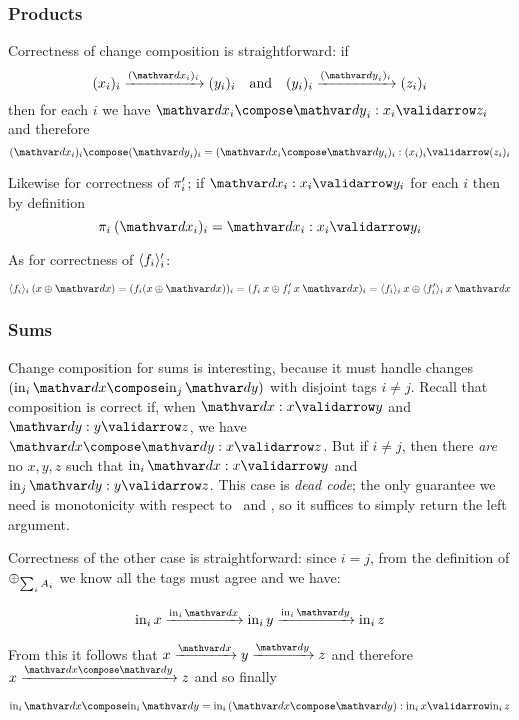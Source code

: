 \subsubsection{Products}

Correctness of change composition is straightforward: if
%
\[ \vld{(\dx_i)_i}{(x_i)_i}{(y_i)_i}
\quad\text{and}\quad
\vld{(\dy_i)_i}{(y_i)_i}{(z_i)_i} \]
%
then for each $i$ we have $\valid{\dx_i \compose \dy_i}{x_i}{z_i}$ and therefore
%
\[\valid{(\dx_i)_i \compose (\dy_i)_i = (\dx_i \compose
  \dy_i)_i}{(x_i)_i}{(z_i)_i}\]

\noindent
Likewise for correctness of $\pi'_i$; if $\valid{\dx_i}{x_i}{y_i}$ for each
$i$ then by definition
\[\valid{\pi_i\<(\dx_i)_i = \dx_i}{x_i}{y_i}\]

\noindent As for correctness of $\langle{f_i}\rangle_i'$:

\nopagebreak[2]
\begin{equation*}
  \fork{f_i}_i \<(x \upd \dx)
  = (f_i(x \upd \dx))_i
  = (f_i\<x \upd \deriv f_i \<x \<\dx)_i
  = \fork{f_i}_i \<x \upd \fork{\deriv f_i}_i \<x \<\dx
\end{equation*}

\subsubsection{Sums}

Change composition for sums is interesting, because it must handle changes
$(\inj i \dx \compose \inj j \dy)$ with disjoint tags $i \ne j$. Recall that
composition is correct if, when $\valid\dx x y$ and $\valid\dy y z$, we have
$\valid{\dx\compose\dy} x z$. But if $i \ne j$, then
%
there \emph{are} no $x,y,z$ such that $\valid{\inj i \dx} x y$ and $\valid{\inj j \dy} y z$.
%
This case is \emph{dead code}; the only guarantee we need is monotonicity with
respect to \dx\ and \dy, so it suffices to simply return the left argument.

Correctness of the other case is straightforward: since $i = j$, from the
definition of ${\mathbin{\oplus}}_{\sum_i A_i}$ we know all the tags must agree and we have:

\nopagebreak[2]
\[ \inj i x \longvalidarrow{\inj i \dx} \inj i y
\longvalidarrow{\inj i \dy} \inj i z \]

\noindent From this it follows that \( {x} \longvalidarrow{\dx} {y}
\longvalidarrow{\dy} {z} \) and therefore $\vld{\dx\compose\dy} x z$ and so
finally

\nopagebreak[2]
\[ \valid{\inj i \dx \compose \inj i \dy = \inj i (\dx \compose \dy)}{\inj i x}{\inj i z} \]

